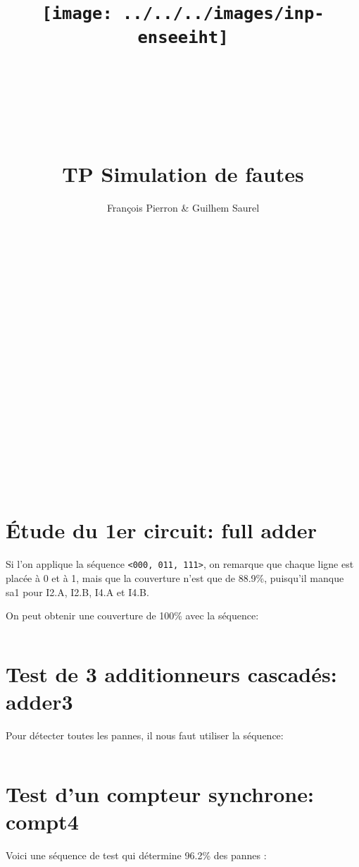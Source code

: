 \documentclass[11pt]{article}
\title{\texttt{[image: ../../../images/inp-enseeiht]} \\ ~ \\ ~ \\ ~ \\ ~ \\ TP Simulation de fautes}
\author{François Pierron \& Guilhem Saurel}
\date{\oldstylenums{15 novembre 2013}}
\begin{document}
\begin{titlepage}
    \setcounter{page}{0}
    \maketitle
    ~ \\ ~ \\ ~ \\ ~ \\ ~ \\ ~ \\
    ~ \\ ~ \\ ~ \\ ~ \\ ~ \\ ~ \\
    ~ \\ ~ \\ ~ \\ ~ \\ ~ \\
    \tableofcontents
    \thispagestyle{empty}
\end{titlepage}

\section{Étude du 1er circuit: full adder}

Si l’on applique la séquence \verb|<000, 011, 111>|, on remarque que chaque ligne est placée à 0 et à 1, mais que la couverture n’est que de 88.9\%, puisqu’il manque sa1 pour I2.A, I2.B, I4.A et I4.B.

On peut obtenir une couverture de 100\% avec la séquence:
\inputminted[linenos]{verilog}{full_adder.v}

\section{Test de 3 additionneurs cascadés: adder3}

Pour détecter toutes les pannes, il nous faut utiliser la séquence:
\inputminted[linenos]{verilog}{adder3.v}


\section{Test d’un compteur synchrone: compt4}

Voici une séquence de test qui détermine 96.2\% des pannes :
\inputminted[linenos]{verilog}{compt4.v}
\end{document}
